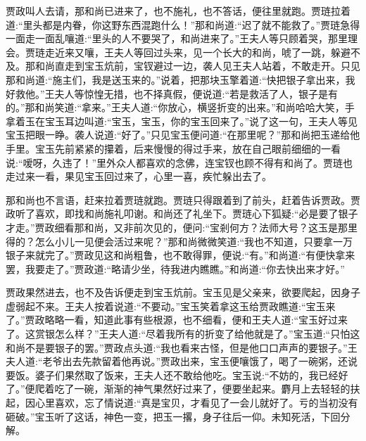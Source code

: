 \begin{parag}
    贾政叫人去请，那和尚已进来了，也不施礼，也不答话，便往里就跑。贾琏拉着道:“里头都是内眷，你这野东西混跑什么！”那和尚道:“迟了就不能救了。”贾琏急得一面走一面乱嚷道:“里头的人不要哭了，和尚进来了。”王夫人等只顾着哭，那里理会。贾琏走近来又嚷，王夫人等回过头来，见一个长大的和尚，唬了一跳，躲避不及。那和尚直走到宝玉炕前，宝钗避过一边，袭人见王夫人站着，不敢走开。只见那和尚道:“施主们，我是送玉来的。”说着，把那块玉擎着道:“快把银子拿出来，我好救他。”王夫人等惊惶无措，也不择真假，便说道:“若是救活了人，银子是有的。”那和尚笑道:“拿来。”王夫人道:“你放心，横竖折变的出来。”和尚哈哈大笑，手拿着玉在宝玉耳边叫道:“宝玉，宝玉，你的宝玉回来了。”说了这一句，王夫人等见宝玉把眼一睁。袭人说道:“好了。”只见宝玉便问道:“在那里呢？”那和尚把玉递给他手里。宝玉先前紧紧的攥着，后来慢慢的得过手来，放在自己眼前细细的一看说:“嗳呀，久违了！”里外众人都喜欢的念佛，连宝钗也顾不得有和尚了。贾琏也走过来一看，果见宝玉回过来了，心里一喜，疾忙躲出去了。
\end{parag}


\begin{parag}
    那和尚也不言语，赶来拉着贾琏就跑。贾琏只得跟着到了前头，赶着告诉贾政。贾政听了喜欢，即找和尚施礼叩谢。和尚还了礼坐下。贾琏心下狐疑:“必是要了银子才走。”贾政细看那和尚，又非前次见的，便问:“宝剎何方？法师大号？这玉是那里得的？怎么小儿一见便会活过来呢？”那和尚微微笑道:“我也不知道，只要拿一万银子来就完了。”贾政见这和尚粗鲁，也不敢得罪，便说:“有。”和尚道:“有便快拿来罢，我要走了。”贾政道:“略请少坐，待我进内瞧瞧。”和尚道:“你去快出来才好。”
\end{parag}


\begin{parag}
    贾政果然进去，也不及告诉便走到宝玉炕前。宝玉见是父亲来，欲要爬起，因身子虚弱起不来。王夫人按着说道:“不要动。”宝玉笑着拿这玉给贾政瞧道:“宝玉来了。”贾政略略一看，知道此事有些根源，也不细看，便和王夫人道:“宝玉好过来了。这赏银怎么样？”王夫人道:“尽着我所有的折变了给他就是了。”宝玉道:“只怕这和尚不是要银子的罢。”贾政点头道:“我也看来古怪，但是他口口声声的要银子。”王夫人道:“老爷出去先款留着他再说。”贾政出来，宝玉便嚷饿了，喝了一碗粥，还说要饭。婆子们果然取了饭来，王夫人还不敢给他吃。宝玉说:“不妨的，我已经好了。”便爬着吃了一碗，渐渐的神气果然好过来了，便要坐起来。麝月上去轻轻的扶起，因心里喜欢，忘了情说道:“真是宝贝，才看见了一会儿就好了。亏的当初没有砸破。”宝玉听了这话，神色一变，把玉一撂，身子往后一仰。未知死活，下回分解。
\end{parag}